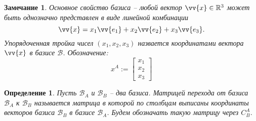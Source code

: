 \documentclass[12pt]{article}
\newtheorem{remark}[theorem]{Замечание}
\newtheorem{definition}[theorem]{Определение}
\begin{document}
\begin{remark}
    Основное свойство базиса -- любой вектор $\vv{x}\in\mathbb{R}^3$ может быть однозначно
    представлен в виде линейной комбинации
    $$
    \vv{x}=x_1 \vv{e_1}+x_2 \vv{e_2} + x_3 \vv{e_3}.
    $$
    Упорядоченная тройка чисел $(x_1,x_2,x_3)$ назвается координатами вектора $\vv{x}$
    в базисе $\mathcal{B}$. Обозначение:
    $$
        x^A:=\begin{bmatrix}x_1 \\ x_2 \\ x_3\end{bmatrix}
    $$
\end{remark}

\begin{definition}
    Пусть $\mathcal{B}_A$ и $\mathcal{B}_B$ -- два базиса. Матрицей перехода от
    базиса $\mathcal{B}_A$ к $\mathcal{B}_B$ называется матрица в которой по столбцам выписаны
    координаты векторов базиса $\mathcal{B}_B$ в базисе $\mathcal{B}_A$. Будем обозначать такую
    матрицу через $C_B^A$.
\end{definition}
\end{document}
